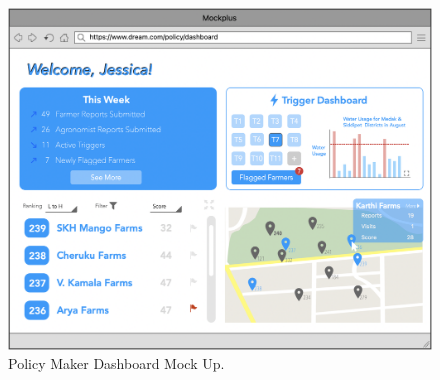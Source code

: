 \begin{multicols}{3}
 
\begin{figure}[H]
 \centering
\includegraphics[scale=0.392]{../images_diagrams/mock_ups/policydash100.png}
 \caption{\label{fig:mock_polish}Policy Maker Dashboard Mock Up.}
 \end{figure}
 
 
\end{multicols}





